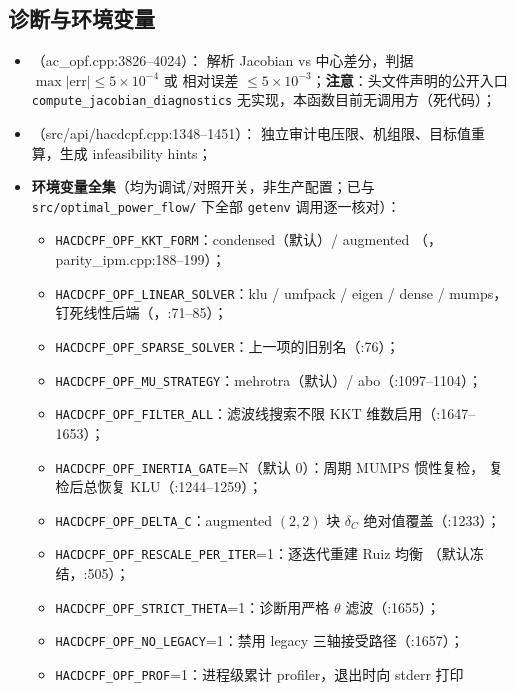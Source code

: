 \subsection{诊断与环境变量}
\begin{itemize}
  \item {}（ac\_opf.cpp:3826--4024）：
        解析 Jacobian vs 中心差分，判据 $\max|\mathrm{err}|\le5\times10^{-4}$ 或
        相对误差 $\le5\times10^{-3}$；\textbf{注意}：头文件声明的公开入口
        \texttt{compute\_jacobian\_diagnostics} 无实现，本函数目前无调用方（死代码）；
  \item {}（src/api/hacdcpf.cpp:1348--1451）：
        独立审计电压限、机组限、目标值重算，生成 infeasibility hints；
  \item \textbf{环境变量全集}（均为调试/对照开关，非生产配置；已与
        \texttt{src/optimal\_power\_flow/} 下全部 \texttt{getenv} 调用逐一核对）：
        \begin{itemize}\footnotesize
        \item \texttt{HACDCPF\_OPF\_KKT\_FORM}：condensed（默认）/ augmented
              （，parity\_ipm.cpp:188--199）；
        \item \texttt{HACDCPF\_OPF\_LINEAR\_SOLVER}：klu / umfpack / eigen / dense / mumps，
              钉死线性后端（，:71--85）；
        \item \texttt{HACDCPF\_OPF\_SPARSE\_SOLVER}：上一项的旧别名（:76）；
        \item \texttt{HACDCPF\_OPF\_MU\_STRATEGY}：mehrotra（默认）/ abo（:1097--1104）；
        \item \texttt{HACDCPF\_OPF\_FILTER\_ALL}：滤波线搜索不限 KKT 维数启用（:1647--1653）；
        \item \texttt{HACDCPF\_OPF\_INERTIA\_GATE}=N（默认 0）：周期 MUMPS 惯性复检，
              复检后总恢复 KLU（:1244--1259）；
        \item \texttt{HACDCPF\_OPF\_DELTA\_C}：augmented $(2,2)$ 块 $\delta_C$ 绝对值覆盖（:1233）；
        \item \texttt{HACDCPF\_OPF\_RESCALE\_PER\_ITER}=1：逐迭代重建 Ruiz 均衡
              （默认冻结，:505）；
        \item \texttt{HACDCPF\_OPF\_STRICT\_THETA}=1：诊断用严格 $\theta$ 滤波（:1655）；
        \item \texttt{HACDCPF\_OPF\_NO\_LEGACY}=1：禁用 legacy 三轴接受路径（:1657）；
        \item \texttt{HACDCPF\_OPF\_PROF}=1：进程级累计 profiler，退出时向 stderr 打印

\end{itemize}
\end{itemize}
